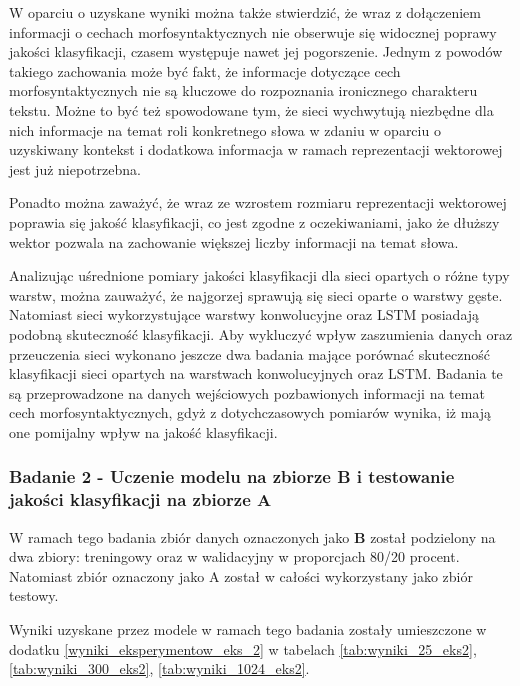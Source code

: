 \hfill


\noindent W oparciu o uzyskane wyniki można także stwierdzić, że wraz z dołączeniem informacji o cechach morfosyntaktycznych nie obserwuje się widocznej poprawy jakości klasyfikacji, czasem występuje nawet jej pogorszenie. Jednym z powodów takiego zachowania może być fakt, że informacje dotyczące cech morfosyntaktycznych nie są kluczowe do rozpoznania ironicznego charakteru tekstu. Możne to być też spowodowane tym, że sieci wychwytują niezbędne dla nich informacje na temat roli konkretnego słowa w zdaniu w oparciu o uzyskiwany kontekst i dodatkowa informacja w ramach reprezentacji wektorowej jest już niepotrzebna.

Ponadto można zaważyć, że wraz ze wzrostem rozmiaru reprezentacji wektorowej poprawia się jakość klasyfikacji, co jest zgodne z oczekiwaniami, jako że dłuższy wektor pozwala na zachowanie większej liczby informacji na temat słowa.


Analizując uśrednione pomiary jakości klasyfikacji dla sieci opartych o różne typy warstw, można zauważyć, że najgorzej sprawują się sieci oparte o warstwy gęste. Natomiast sieci wykorzystujące warstwy konwolucyjne oraz LSTM posiadają podobną skuteczność klasyfikacji. Aby wykluczyć wpływ zaszumienia danych oraz przeuczenia sieci wykonano jeszcze dwa badania mające porównać skuteczność klasyfikacji sieci opartych na warstwach konwolucyjnych oraz LSTM. Badania te są przeprowadzone na danych wejściowych pozbawionych informacji na temat cech morfosyntaktycznych, gdyż z dotychczasowych pomiarów wynika, iż mają one pomijalny wpływ na jakość klasyfikacji.


\subsubsection{Badanie 2 - Uczenie modelu na zbiorze B i testowanie jakości klasyfikacji na zbiorze A }

W ramach tego badania zbiór danych oznaczonych jako \textbf{B} został podzielony na dwa zbiory: treningowy oraz w walidacyjny w proporcjach 80/20 procent. Natomiast zbiór oznaczony jako A został w całości wykorzystany jako zbiór testowy.

Wyniki uzyskane przez modele w ramach tego badania zostały umieszczone w dodatku \ref{wyniki_eksperymentow_eks_2} w tabelach \ref{tab:wyniki_25_eks2}, \ref{tab:wyniki_300_eks2}, \ref{tab:wyniki_1024_eks2}.


